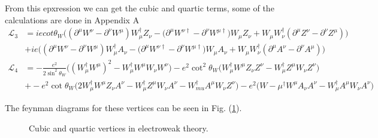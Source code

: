 \documentclass[11pt]{article}
\begin{document}
\begin{flushleft}
From this epxression we can get the cubic and quartic terms, some of the calculations are done in Appendix A
\begin{align*}
\mathcal{L}_3 
&= ie cot \theta_W \Big( (\partial^{\mu} W^{\nu}- \partial^{\nu} W^{\mu})W_{\mu}^{\dagger} Z_{\nu} 
- \big( \partial^{\mu} W^{\nu \dagger} - \partial^{\nu} W^{\mu \dagger} \big) W_{\mu} Z_{\nu} 
+ W_{\mu} W_{\nu}^{\dagger} (\partial^{\mu} Z^{\nu} - \partial^{\nu} Z^{\mu}) \Big)\\
&+ ie \Big( (\partial^{\mu} W^{\nu} - \partial^{\nu} W^{\mu}) W_{\mu}^{\dagger} A_{\nu} 
- \Big( \partial^{\mu} W^{\nu \dagger} - \partial^{\nu} W^{\mu \dagger} \Big)W_{\mu} A_{\nu} 
+ W_{\mu} W_{\nu}^{\dagger} (\partial^{\mu} A^{\nu}- \partial^{\nu} A^{\mu}) \Big)\\
\mathcal{L}_4 &= - \frac{e^2}{2 \sin^2 \theta_W} \Big( (W_{\mu}^{\dagger}W^{\mu})^2 - W_{\mu}^{\dagger} W^{\mu} W_{\nu} W^{\nu} \Big) - e^2 \cot^2 \theta_W \Big( W_{\mu}^{\dagger}W^{\mu} Z_{\nu}Z^{\nu} - W_{\mu}^{\dagger} Z^{\mu}W_{\nu} Z^{\nu}  \Big)\\
&+ -e^2 \cot \theta_W \Big( 2 W_{\mu}^{\dagger} W^{\mu} Z_{\nu} A^{\nu} - W_{\mu}^{\dagger} Z^{\mu} W_{\nu} A^{\nu} - W_{mu}^{\dagger}A^{\mu} W_{\nu} Z^{\nu} \Big) - e^2 \Big( 
W-{\mu}^{\dagger} W^{\mu} A_{\nu} A^{\nu}- W_{\mu}^{\dagger}A^{\mu} W_{\nu} A^{\nu} 
\Big)
\end{align*}

\end{flushleft}
\begin{multicols}{2}

\begin{flushleft}

The feynman diagrams for these vertices can be seen in Fig. (\ref{fig:: cubic and quartic in EW}).
\begin{figure}[H]
\centering
{}
\caption{Cubic and quartic vertices in electroweak theory.}
\label{fig:: cubic and quartic in EW}
\end{figure}
\end{flushleft}




\end{multicols}
\end{document}
